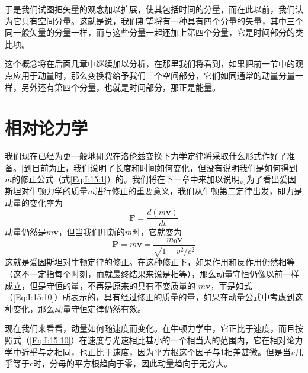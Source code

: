 于是我们试图把矢量的观念加以扩展，使其包括时间的分量，而在此以前，我们认为它只有空间分量。这就是说，我们期望将有一种具有四个分量的矢量，其中三个同一般矢量的分量一样，而与这些分量一起还加上第四个分量，它是时间部分的类比项。

这个概念将在后面几章中继续加以分析，在那里我们将看到，如果把前一节中的观点应用于动量时，那么变换将给予我们三个空间部分，它们如同通常的动量分量一样，另外还有第四个分量，也就是时间部分，那正是能量。

\section{相对论力学}

我们现在已经为更一般地研究在洛伦兹变换下力学定律将采取什么形式作好了准备。[到目前为止，我们说明了长度和时间如何变化，但没有说明我们是如何得到$m$的修正公式（式\ref{Eq:I:15:1}）的。我们将在下一章中来加以说明。]为了看出爱因斯坦对牛顿力学的质量$m$进行修正的重要意义，我们从牛顿第二定律出发，即力是动量的变化率为
\begin{equation*}
    \boldsymbol{F} = \frac{d(m\boldsymbol{v})}{dt}
\end{equation*}
动量仍然是$m\boldsymbol{v}$，但当我们用新的$m$时，它就变为
\begin{equation}
    \label{Eq:I:15:10}
    \boldsymbol{P} = m\boldsymbol{v} = \frac{m_0\boldsymbol{v}}{\sqrt{1-v^2/c^2}}
\end{equation}
这就是爱因斯坦对牛顿定律的修正。在这种修正下，如果作用和反作用仍然相等（这不一定指每个时刻，而就最终结果来说是相等），那么动量守恒仍像以前一样成立，但是守恒的量，不再是原来的具有不变质量的 $m\boldsymbol{v}$，而是如式（\ref{Eq:I:15:10}）所表示的，具有经过修正的质量的量，如果在动量公式中考虑到这种变化，那么动量守恒定律仍然有效。

现在我们来看看，动量如何随速度而变化。在牛顿力学中，它正比于速度，而且按照式（\ref{Eq:I:15:10}）在速度与光速相比甚小的一个相当大的范围内，它在相对论力学中近乎与之相同，也正比于速度，因为平方根这个因子与1相差甚微。但是当$v$几乎等于$c$时，分母的平方根趋向于零，因此动量趋向于无穷大。

